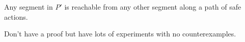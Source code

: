 \documentclass[]{styles/svproc}  %
\begin{document}
\begin{conjecture}
Any segment in $P'$ is reachable from any other segment along a path of safe
actions.
\end{conjecture}

Don't have a proof but have lots of experiments with no counterexamples.


%


%




%



%
\end{document}

